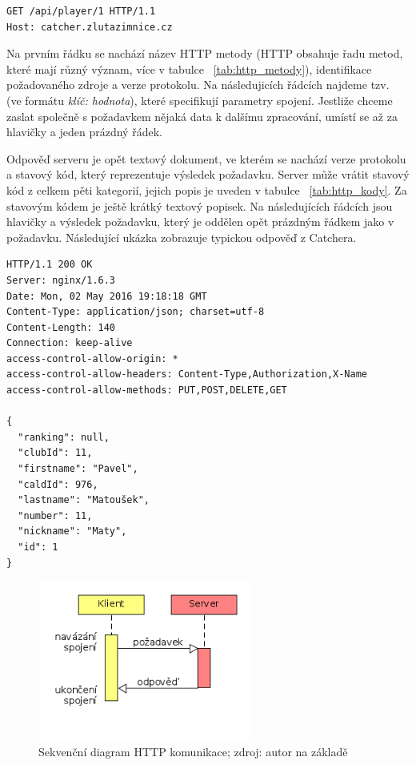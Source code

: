 \begingroup
\fontsize{9.5pt}{11pt}\selectfont
\begin{verbatim}
GET /api/player/1 HTTP/1.1
Host: catcher.zlutazimnice.cz
\end{verbatim}
\endgroup

Na prvním řádku se nachází název HTTP metody (HTTP obsahuje řadu metod, které mají různý význam, více v tabulce ~\ref{tab:http_metody}),
identifikace požadovaného zdroje a verze protokolu. Na následujicích řádcích najdeme tzv.~
(ve formátu \textit{klíč: hodnota}), které specifikují parametry spojení. Jestliže chceme zaslat společně s požadavkem
nějaká data k dalšímu zpracování, umístí se až za hlavičky a jeden prázdný řádek.


Odpověď serveru je opět textový dokument, ve kterém se nachází verze protokolu a stavový kód,
který reprezentuje výsledek požadavku. Server může vrátit stavový kód z celkem pěti kategorií,
jejich popis je uveden v tabulce ~\ref{tab:http_kody}. Za stavovým kódem je ještě krátký textový popisek. Na následujících
řádcích jsou hlavičky a výsledek požadavku, který je oddělen opět prázdným řádkem jako v požadavku.
Následující ukázka zobrazuje typickou odpověď z Catchera. 

\begingroup
\fontsize{9.5pt}{11pt}\selectfont
\begin{verbatim}
HTTP/1.1 200 OK
Server: nginx/1.6.3
Date: Mon, 02 May 2016 19:18:18 GMT
Content-Type: application/json; charset=utf-8
Content-Length: 140
Connection: keep-alive
access-control-allow-origin: *
access-control-allow-headers: Content-Type,Authorization,X-Name
access-control-allow-methods: PUT,POST,DELETE,GET

{
  "ranking": null,
  "clubId": 11,
  "firstname": "Pavel",
  "caldId": 976,
  "lastname": "Matoušek",
  "number": 11,
  "nickname": "Maty",
  "id": 1
}
\end{verbatim}
\endgroup
 
 \begin{figure}[ht!]
\centering
\includegraphics[width=70mm]{./images/http-komunikace.png}
\caption{Sekvenční diagram HTTP komunikace; zdroj: autor na základě~\cite{rest_vse}\label{overflow}}
\end{figure}

